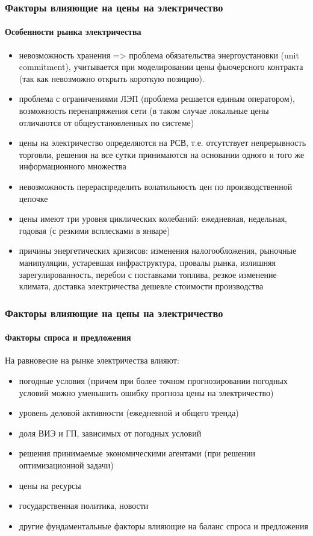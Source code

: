 \documentclass[c, dvipsnames]{beamer}  %
\begin{document}
\begin{frame}[shrink=5]
\frametitle{Факторы  влияющие на цены на электричество} 
\framesubtitle{Особенности рынка электричества} 

\begin{itemize}
	\item невозможность хранения => проблема обязательства энергоустановки (unit commitment), учитывается при моделировании цены фьючерсного контракта (так как невозможно открыть короткую позицию). 
	\item проблема с ограничениями ЛЭП (проблема решается единым оператором), возможность перенапряжения сети (в таком случае локальные цены отличаются от общеустановленных по системе) 
	\item цены на электричество определяются на РСВ, т.е. отсутствует непрерывность торговли, решения на все сутки принимаются на основании одного и того же информационного множества
	\item невозможность перераспределить волатильность цен по производственной цепочке 
	\item  цены имеют три уровня циклических колебаний: ежедневная, недельная, годовая (с резкими всплесками в январе)
	\item причины энергетических кризисов: изменения налогообложения, рыночные манипуляции, устаревшая инфраструктура, провалы рынка, излишняя зарегулированность, перебои с поставками топлива, резкое изменение климата,  доставка электричества дешевле стоимости производства 
	
\end{itemize}


\end{frame}



\begin{frame}[shrink=5]
\frametitle{Факторы  влияющие на цены на электричество} 
\framesubtitle{Факторы спроса и предложения} 

На равновесие на рынке  электричества влияют: 

\begin{itemize}
	\item  погодные условия (причем при более точном прогнозировании погодных условий можно уменьшить ошибку прогноза цены на электричество)
	\item  уровень  деловой активности  (ежедневной и общего тренда)
	\item  доля ВИЭ и ГП, зависимых от погодных условий
	\item  решения принимаемые  экономическими агентами (при решении оптимизационной задачи)
	\item  цены на ресурсы
	\item  государственная политика, новости
	\item  другие фундаментальные факторы влияющие на баланс спроса и предложения
\end{itemize}

\end{frame}
\end{document}
